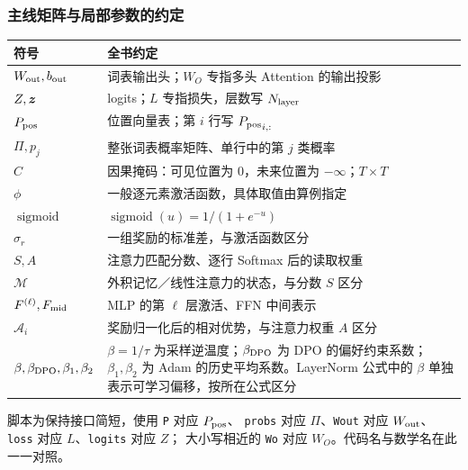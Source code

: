 \subsubsection*{主线矩阵与局部参数的约定}
\begin{center}\small
\renewcommand{\arraystretch}{1.2}
\begin{tabularx}{\linewidth}{@{}p{32mm}X@{}}\toprule
符号 & 全书约定\\\midrule
$W_{\rm out},b_{\rm out}$ & 词表输出头；$W_O$ 专指多头 Attention 的输出投影\\
$Z,\boldsymbol{z}$ & logits；$L$ 专指损失，层数写 $N_{\rm layer}$\\
$P_{\rm pos}$ & 位置向量表；第 $i$ 行写 ${P_{\rm pos}}_{i,:}$\\
$\Pi,p_j$ & 整张词表概率矩阵、单行中的第 $j$ 类概率\\
$C$ & 因果掩码：可见位置为 $0$，未来位置为 $-\infty$；$T\times T$\\
$\phi$ & 一般逐元素激活函数，具体取值由算例指定\\
$\operatorname{sigmoid}$ & $\operatorname{sigmoid}(u)=1/(1+e^{-u})$\\
$\sigma_r$ & 一组奖励的标准差，与激活函数区分\\
$S,A$ & 注意力匹配分数、逐行 Softmax 后的读取权重\\
$\mathcal{M}$ & 外积记忆／线性注意力的状态，与分数 $S$ 区分\\
$F^{(\ell)},F_{\rm mid}$ & MLP 的第 $\ell$ 层激活、FFN 中间表示\\
$\mathcal A_i$ & 奖励归一化后的相对优势，与注意力权重 $A$ 区分\\
$\beta,\beta_{\rm DPO},\beta_1,\beta_2$ & $\beta=1/\tau$ 为采样逆温度；$\beta_{\rm DPO}$ 为 DPO 的偏好约束系数；$\beta_1,\beta_2$ 为 Adam 的历史平均系数。LayerNorm 公式中的 $\beta$ 单独表示可学习偏移，按所在公式区分\\
\bottomrule\end{tabularx}
\end{center}
脚本为保持接口简短，使用 \texttt{P} 对应 $P_{\rm pos}$、
\texttt{probs} 对应 $\Pi$、\texttt{Wout} 对应 $W_{\rm out}$、
\texttt{loss} 对应 $L$、\texttt{logits} 对应 $Z$；
大小写相近的 \texttt{Wo} 对应 $W_O$。代码名与数学名在此一一对照。


